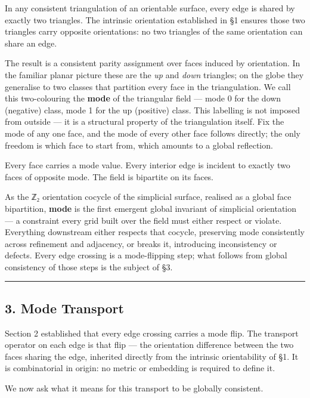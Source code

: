 \documentclass[
  11pt,
  a4paper,
]{article}
\begin{document}
In any consistent triangulation of an orientable surface, every edge is
shared by exactly two triangles. The intrinsic orientation established
in §1 ensures those two triangles carry opposite orientations: no two
triangles of the same orientation can share an edge.

The result is a consistent parity assignment over faces induced by
orientation. In the familiar planar picture these are the \emph{up} and
\emph{down} triangles; on the globe they generalise to two classes that
partition every face in the triangulation. We call this two-colouring
the \textbf{mode} of the triangular field --- mode 0 for the down
(negative) class, mode 1 for the up (positive) class. This labelling is
not imposed from outside --- it is a structural property of the
triangulation itself. Fix the mode of any one face, and the mode of
every other face follows directly; the only freedom is which face to
start from, which amounts to a global reflection.

Every face carries a mode value. Every interior edge is incident to
exactly two faces of opposite mode. The field is bipartite on its faces.

As the ℤ₂ orientation cocycle of the simplicial surface, realised as a
global face bipartition, \textbf{mode} is the first emergent global
invariant of simplicial orientation --- a constraint every grid built
over the field must either respect or violate. Everything downstream
either respects that cocycle, preserving mode consistently across
refinement and adjacency, or breaks it, introducing inconsistency or
defects. Every edge crossing is a mode-flipping step; what follows from
global consistency of those steps is the subject of §3.

\begin{center}\rule{0.5\linewidth}{0.5pt}\end{center}

\subsection{3. Mode Transport}\label{mode-transport}

Section 2 established that every edge crossing carries a mode flip. The
transport operator on each edge is that flip --- the orientation
difference between the two faces sharing the edge, inherited directly
from the intrinsic orientability of §1. It is combinatorial in origin:
no metric or embedding is required to define it.

We now ask what it means for this transport to be globally consistent.
\end{document}
